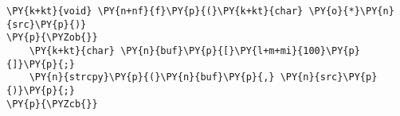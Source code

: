 \begin{Verbatim}[commandchars=\\\{\}]
\PY{k+kt}{void} \PY{n+nf}{f}\PY{p}{(}\PY{k+kt}{char} \PY{o}{*}\PY{n}{src}\PY{p}{)}
\PY{p}{\PYZob{}}
    \PY{k+kt}{char} \PY{n}{buf}\PY{p}{[}\PY{l+m+mi}{100}\PY{p}{]}\PY{p}{;}
    \PY{n}{strcpy}\PY{p}{(}\PY{n}{buf}\PY{p}{,} \PY{n}{src}\PY{p}{)}\PY{p}{;}
\PY{p}{\PYZcb{}}
\end{Verbatim}
